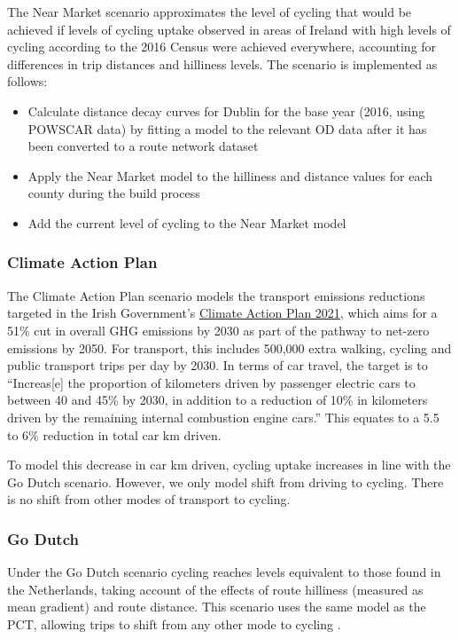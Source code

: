 \documentclass[
  super,
  preprint,
  3p]{elsarticle}
\providecommand{\tightlist}{%
  \setlength{\itemsep}{0pt}\setlength{\parskip}{0pt}}\usepackage{longtable,booktabs,array}
\begin{document}
The Near Market scenario approximates the level of cycling that would be
achieved if levels of cycling uptake observed in areas of Ireland with
high levels of cycling according to the 2016 Census were achieved
everywhere, accounting for differences in trip distances and hilliness
levels. The scenario is implemented as follows:

\begin{itemize}
\tightlist
\item
  Calculate distance decay curves for Dublin for the base year (2016,
  using POWSCAR data) by fitting a model to the relevant OD data after
  it has been converted to a route network dataset
\item
  Apply the Near Market model to the hilliness and distance values for
  each county during the build process
\item
  Add the current level of cycling to the Near Market model
\end{itemize}

\subsubsection{Climate Action Plan}\label{climate-action-plan}

The Climate Action Plan scenario models the transport emissions
reductions targeted in the Irish Government's
\href{https://www.gov.ie/en/publication/6223e-climate-action-plan-2021/}{Climate
Action Plan 2021}, which aims for a 51\% cut in overall GHG emissions by
2030 as part of the pathway to net-zero emissions by 2050. For
transport, this includes 500,000 extra walking, cycling and public
transport trips per day by 2030. In terms of car travel, the target is
to ``Increas{[}e{]} the proportion of kilometers driven by passenger
electric cars to between 40 and 45\% by 2030, in addition to a reduction
of 10\% in kilometers driven by the remaining internal combustion engine
cars.'' This equates to a 5.5 to 6\% reduction in total car km driven.

To model this decrease in car km driven, cycling uptake increases in
line with the Go Dutch scenario. However, we only model shift from
driving to cycling. There is no shift from other modes of transport to
cycling.

\subsubsection{Go Dutch}\label{go-dutch}

Under the Go Dutch scenario cycling reaches levels equivalent to those
found in the Netherlands, taking account of the effects of route
hilliness (measured as mean gradient) and route distance. This scenario
uses the same model as the PCT, allowing trips to shift from any other
mode to cycling \citep{lovelace2017}.
\end{document}
